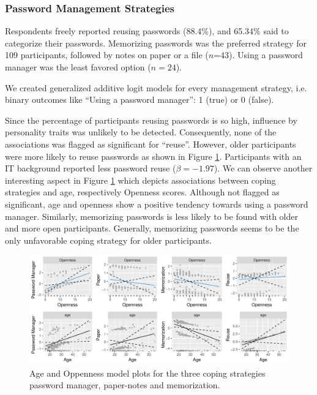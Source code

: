 
\subsubsection{Password Management Strategies}
Respondents freely reported reusing passwords (88.4\%), and 65.34\% said to categorize their passwords. Memorizing passwords was the preferred strategy for 109 participants, followed by notes on paper or a file ($n$=43). Using a password manager was the least favored option ($n=24$).

We created generalized additive logit models for every management strategy, i.e. binary outcomes like ``Using a password manager'': 1 (true) or 0 (false). 

Since the percentage of participants reusing passwords is so high, influence by personality traits was unlikely to be detected. Consequently, none of the associations was flagged as significant for ``reuse''. However, older participants were more likely to reuse passwords as shown in Figure \ref{fig:personality:study3:age-openness-coping-all}. Participants with an IT background reported less password reuse ($\beta=-1.97$). We can observe another interesting aspect in Figure \ref{fig:personality:study3:age-openness-coping-all} which depicts associations between coping strategies and age, respectively Openness scores. Although not flagged as significant, age and openness show a positive tendency towards using a password manager. Similarly, memorizing passwords is less likely to be found with older and more open participants. Generally, memorizing passwords seems to be the only unfavorable coping strategy for older participants. 
\begin{figure}[tbph]
	\centering
	\includegraphics[width=1\linewidth]{figures/personality/age-openness-coping-all}
	\caption{\label{fig:personality:study3:age-openness-coping-all}Age and Oppenness model plots for the three coping strategies password manager, paper-notes and memorization.}
\end{figure}

